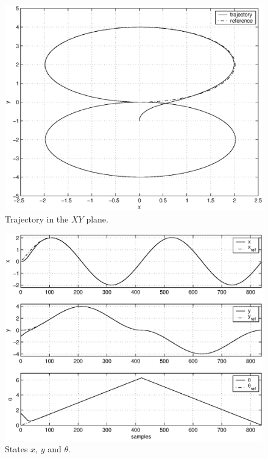 \documentclass[conference]{IEEEtran} %
\begin{document}
\begin{figure}[H]\begin{center}
    \includegraphics[width=.99\linewidth]{Figures/traj8.eps}
    \caption{Trajectory in the $XY$ plane.}
    \label{fig:traj8}
\end{center}\end{figure}
\begin{figure}[H]\begin{center}
    \includegraphics[width=.99\linewidth]{Figures/states.eps}
    \caption{States $x$, $y$ and $\theta$.}
    \label{fig:states}
\end{center}\end{figure}
\end{document}
